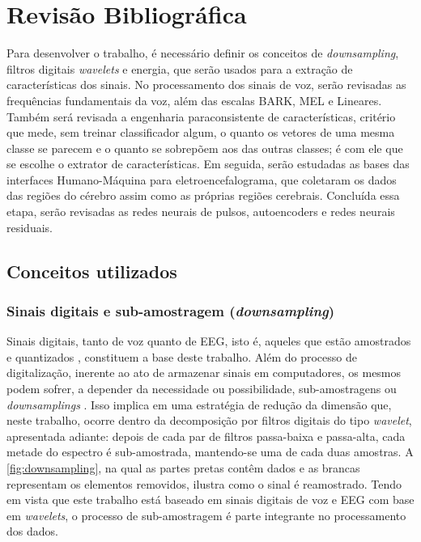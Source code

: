 \chapter{Revisão Bibliográfica}
	\label{ch:revisao}
	
	\par Para desenvolver o trabalho, é necessário definir os conceitos de \textit{downsampling}, filtros digitais \textit{wavelets} e energia, que serão usados para a extração de características dos sinais. No processamento dos sinais de voz, serão revisadas as frequências fundamentais da voz, além das escalas BARK, MEL e Lineares. Também será revisada a engenharia paraconsistente de características, critério que mede, sem treinar classificador algum, o quanto os vetores de uma mesma classe se parecem e o quanto se sobrepõem aos das outras classes; é com ele que se escolhe o extrator de características. Em seguida, serão estudadas as bases das interfaces Humano-Máquina para eletroencefalograma, que coletaram os dados das regiões do cérebro assim como as próprias regiões cerebrais. Concluída essa etapa, serão revisadas as redes neurais de pulsos, autoencoders e redes neurais residuais.

	\section{Conceitos utilizados}
		\label{sec:conceitos}
		\subsection{Sinais digitais e sub-amostragem (\textit{downsampling})}
			\par Sinais digitais, tanto de voz quanto de EEG, isto é, aqueles que estão amostrados e quantizados \cite{haykin2011sistemas}, constituem a base deste trabalho. Além do processo de digitalização, inerente ao ato de armazenar sinais em computadores, os mesmos podem sofrer, a depender da necessidade ou possibilidade, sub-amostragens ou \textit{downsamplings} \cite{robi2003}. Isso implica em uma estratégia de redução da dimensão que, neste trabalho, ocorre dentro da decomposição por filtros digitais do tipo \textit{wavelet}, apresentada adiante: depois de cada par de filtros passa-baixa e passa-alta, cada metade do espectro é sub-amostrada, mantendo-se uma de cada duas amostras. A \autoref{fig:downsampling}, na qual as partes pretas contêm dados e as brancas representam os elementos removidos, ilustra como o sinal é reamostrado. Tendo em vista que este trabalho está baseado em sinais digitais de voz e EEG com base em \textit{wavelets}, o processo de sub-amostragem é parte integrante no processamento dos dados.

